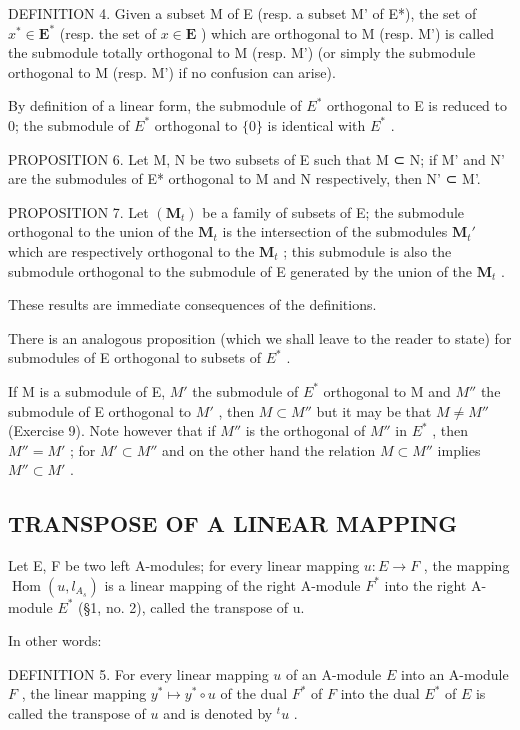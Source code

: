 DEFINITION 4. Given a subset M of E (resp. a subset M' of E*), the set of \(x^* \in \mathbf{E}^*\) (resp. the set of \(x \in \mathbf{E}\) ) which are orthogonal to M (resp. M') is called the submodule totally orthogonal to M (resp. M') (or simply the submodule orthogonal to M (resp. M') if no confusion can arise).

By definition of a linear form, the submodule of \(E^{*}\) orthogonal to E is reduced to 0; the submodule of \(E^{*}\) orthogonal to \(\{0\}\) is identical with \(E^{*}\) .

PROPOSITION 6. Let M, N be two subsets of E such that M ⊂ N; if M' and N' are the submodules of E* orthogonal to M and N respectively, then N' ⊂ M'.

PROPOSITION 7. Let \((\mathbf{M}_t)\) be a family of subsets of E; the submodule orthogonal to the union of the \(\mathbf{M}_t\) is the intersection of the submodules \(\mathbf{M}_t'\) which are respectively orthogonal to the \(\mathbf{M}_t\) ; this submodule is also the submodule orthogonal to the submodule of E generated by the union of the \(\mathbf{M}_t\) .

These results are immediate consequences of the definitions.

There is an analogous proposition (which we shall leave to the reader to state) for submodules of E orthogonal to subsets of \(E^{*}\) .

If M is a submodule of E, \(M'\) the submodule of \(E^{*}\) orthogonal to M and \(M''\) the submodule of E orthogonal to \(M'\) , then \(M \subset M''\) but it may be that \(M \neq M''\) (Exercise 9). Note however that if \(M''\) is the orthogonal of \(M''\) in \(E^{*}\) , then \(M'' = M'\) ; for \(M' \subset M''\) and on the other hand the relation \(M \subset M''\) implies \(M'' \subset M'\) .

\subsection{TRANSPOSE OF A LINEAR MAPPING}

Let E, F be two left A-modules; for every linear mapping \(u: E \to F\) , the mapping \(\operatorname{Hom}(u, l_{A_s})\) is a linear mapping of the right A-module \(F^*\) into the right A-module \(E^*\) (§1, no. 2), called the transpose of u.

In other words:

DEFINITION 5. For every linear mapping \(u\) of an A-module \(E\) into an A-module \(F\) , the linear mapping \(y^{*} \mapsto y^{*} \circ u\) of the dual \(F^{*}\) of \(F\) into the dual \(E^{*}\) of \(E\) is called the transpose of \(u\) and is denoted by \(^{t}u\) .

